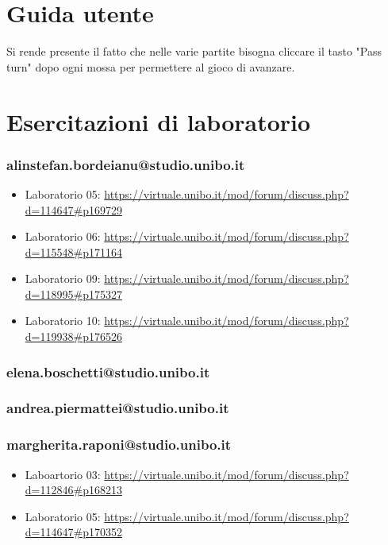 \documentclass[a4paper,12pt]{report}
\begin{document}
\appendix

\chapter{Guida utente}

Si rende presente il fatto che nelle varie partite bisogna cliccare il tasto "Pass turn" dopo ogni mossa per permettere al gioco di avanzare.

\chapter{Esercitazioni di laboratorio}

\subsection{alinstefan.bordeianu@studio.unibo.it}

\begin{itemize}
	\item Laboratorio 05: \url{https://virtuale.unibo.it/mod/forum/discuss.php?d=114647#p169729}
	
	\item Laboratorio 06: \url{https://virtuale.unibo.it/mod/forum/discuss.php?d=115548#p171164}
	
	\item Laboratorio 09: \url{https://virtuale.unibo.it/mod/forum/discuss.php?d=118995#p175327}
	
	\item Laboratorio 10: \url{https://virtuale.unibo.it/mod/forum/discuss.php?d=119938#p176526}
\end{itemize}

\subsection{elena.boschetti@studio.unibo.it}

\subsection{andrea.piermattei@studio.unibo.it}

\subsection{margherita.raponi@studio.unibo.it}
\begin{itemize}
	\item Laboartorio 03: \url{https://virtuale.unibo.it/mod/forum/discuss.php?d=112846#p168213}
	\item Laboratorio 05: \url{https://virtuale.unibo.it/mod/forum/discuss.php?d=114647#p170352}
\end{itemize}
\end{document}
